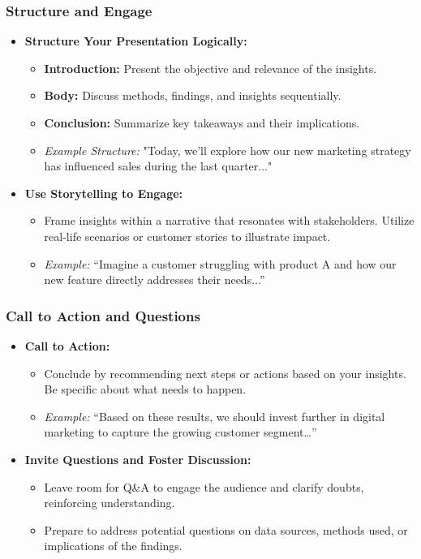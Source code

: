\documentclass{beamer}
\begin{document}
\begin{frame}[fragile]
    \frametitle{Structure and Engage}
    \begin{itemize}
        \item \textbf{Structure Your Presentation Logically:}
            \begin{itemize}
                \item \textbf{Introduction:} Present the objective and relevance of the insights.
                \item \textbf{Body:} Discuss methods, findings, and insights sequentially.
                \item \textbf{Conclusion:} Summarize key takeaways and their implications.
                \item \textit{Example Structure:} "Today, we'll explore how our new marketing strategy has influenced sales during the last quarter..."
            \end{itemize}

        \item \textbf{Use Storytelling to Engage:}
            \begin{itemize}
                \item Frame insights within a narrative that resonates with stakeholders. Utilize real-life scenarios or customer stories to illustrate impact.
                \item \textit{Example:} “Imagine a customer struggling with product A and how our new feature directly addresses their needs...”
            \end{itemize}
    \end{itemize}
\end{frame}

\begin{frame}[fragile]
    \frametitle{Call to Action and Questions}
    \begin{itemize}
        \item \textbf{Call to Action:}
            \begin{itemize}
                \item Conclude by recommending next steps or actions based on your insights. Be specific about what needs to happen.
                \item \textit{Example:} “Based on these results, we should invest further in digital marketing to capture the growing customer segment…”
            \end{itemize}

        \item \textbf{Invite Questions and Foster Discussion:}
            \begin{itemize}
                \item Leave room for Q\&A to engage the audience and clarify doubts, reinforcing understanding.
                \item Prepare to address potential questions on data sources, methods used, or implications of the findings.
            \end{itemize}
    \end{itemize}
\end{frame}
\end{document}
